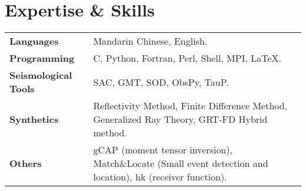 \section*{Expertise \& Skills}

\begin{tabular}{p{} p{}}
\textbf{Languages} & Mandarin Chinese, English. \\
\textbf{Programming} & C, Python, Fortran, Perl, Shell, MPI, LaTeX. \\
\textbf{Seismological Tools} & SAC, GMT, SOD, ObsPy, TauP. \\
\textbf{Synthetics} & Reflectivity Method, Finite Difference Method, Generalized Ray Theory, GRT-FD Hybrid method.\\
\textbf{Others} & gCAP (moment tensor inversion), Match\&Locate (Small event detection and location), hk (receiver function). \\
\end{tabular}
